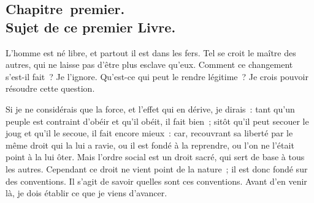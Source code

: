 \documentclass[french,twoside]{book} %
\begin{document}
\subsection[{Chapitre premier. Sujet de ce premier Livre.}]{Chapitre premier. \\
Sujet de ce premier Livre.}
\noindent L’homme est né libre, et partout il est dans les fers. Tel se croit le maître des autres, qui ne laisse pas d’être plus esclave qu’eux. Comment ce changement s’est-il fait ? Je l’ignore. Qu’est-ce qui peut le rendre légitime ? Je crois pouvoir résoudre cette question.\par
Si je ne considérais que la force, et l’effet qui en dérive, je dirais : tant qu’un peuple est contraint d’obéir et qu’il obéit, il fait bien ; sitôt qu’il peut secouer le joug et qu’il le secoue, il fait encore mieux : car, recouvrant sa liberté par le même droit qui la lui a ravie, ou il est fondé à la reprendre, ou l’on ne l’était point à la lui ôter. Mais l’ordre social est un droit sacré, qui sert de base à tous les autres. Cependant ce droit ne vient point de la nature ; il est donc fondé sur des conventions. Il s’agit de savoir quelles sont ces conventions. Avant d’en venir là, je dois établir ce que je viens d’avancer.
\end{document}
